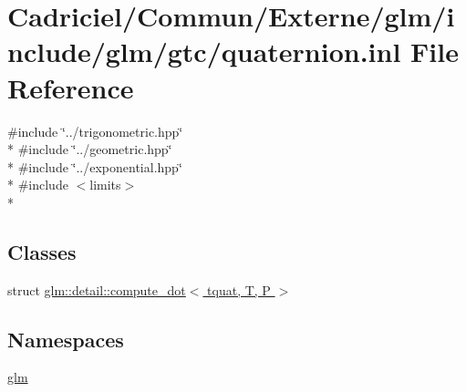 \hypertarget{glm_2include_2glm_2gtc_2quaternion_8inl}{}\section{Cadriciel/\+Commun/\+Externe/glm/include/glm/gtc/quaternion.inl File Reference}
\label{glm_2include_2glm_2gtc_2quaternion_8inl}
{\ttfamily \#include \char`\"{}../trigonometric.\+hpp\char`\"{}}\\*
{\ttfamily \#include \char`\"{}../geometric.\+hpp\char`\"{}}\\*
{\ttfamily \#include \char`\"{}../exponential.\+hpp\char`\"{}}\\*
{\ttfamily \#include $<$limits$>$}\\*
\subsection*{Classes}
\begin{DoxyCompactItemize}
\item 
struct \hyperlink{structglm_1_1detail_1_1compute__dot_3_01tquat_00_01_t_00_01_p_01_4}{glm\+::detail\+::compute\+\_\+dot$<$ tquat, T, P $>$}
\end{DoxyCompactItemize}
\subsection*{Namespaces}
\begin{DoxyCompactItemize}
\item 
 \hyperlink{namespaceglm}{glm}
\end{DoxyCompactItemize}
